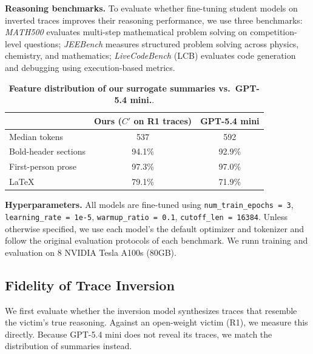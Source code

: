 \documentclass{article}
\begin{document}
\noindent
\textbf{Reasoning benchmarks.}
To evaluate whether fine-tuning student models on inverted traces improves their reasoning performance, we use three benchmarks: \emph{MATH500} \cite{hendrycks2021measuring} evaluates multi-step mathematical problem solving on competition-level questions; \emph{JEEBench} \cite{arora2023have} measures structured problem solving across physics, chemistry, and mathematics; \emph{LiveCodeBench} (LCB) \cite{jain2025livecodebench} evaluates code generation and debugging using execution-based metrics.

\begin{table}
  \vspace{-1.5\baselineskip}
  \centering
  \setlength{\belowcaptionskip}{8pt}
  \caption{\textbf{Feature distribution of our surrogate summaries vs.\ GPT-5.4 mini.}.}
  \label{tab:stylematch}
  \small
  \setlength{\tabcolsep}{1.2pt}
  \begin{tabular}{lcc}
    \toprule
    & Ours ($C'$ on R1 traces) & GPT-5.4 mini \\
    \midrule
    Median tokens & 537 & 592 \\
    Bold-header sections & 94.1\% & 92.9\% \\
    First-person prose & 97.3\% & 97.0\% \\
    LaTeX & 79.1\% & 71.9\% \\
    \bottomrule
  \end{tabular}
\end{table}

\noindent
\textbf{Hyperparameters.}
All models are fine-tuned using 
\texttt{num\_train\_epochs = 3},
\texttt{learning\_rate = 1e-5},
\texttt{warmup\_ratio = 0.1},
\texttt{cutoff\_len = 16384}.
Unless otherwise specified, we use each model's the default optimizer and tokenizer and follow the original evaluation protocols of each benchmark.  We runn training and evaluation on 8 NVIDIA Tesla A100s (80GB). 


\subsection{Fidelity of Trace Inversion}
\label{sec:eval-inversion}



We first evaluate whether the inversion model synthesizes traces that resemble the victim's true reasoning.  Against an open-weight victim (R1), we measure this directly.
Because GPT-5.4 mini does not reveal its traces, we match the distribution of summaries instead.
\end{document}
